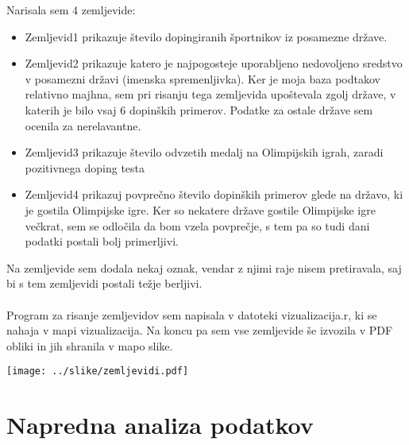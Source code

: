 \documentclass[11pt,a4paper]{article}
\begin{document}
Narisala sem 4 zemljevide:
\begin{itemize}

\item{Zemljevid1 prikazuje število dopingiranih športnikov iz posamezne države.}


\item{Zemljevid2 prikazuje katero je najpogosteje uporabljeno nedovoljeno sredstvo v posamezni državi (imenska spremenljivka).
Ker je moja baza podtakov relativno majhna, sem pri risanju tega zemljevida upoštevala zgolj države, v katerih je bilo vsaj 6 dopinških primerov. Podatke za ostale države sem ocenila za nerelavantne.}

\item{Zemljevid3 prikazuje število odvzetih medalj na Olimpijskih igrah, zaradi pozitivnega doping testa}

\item{Zemljevid4 prikazuj povprečno število dopinških primerov glede na državo, ki je gostila Olimpijske igre. 
Ker so nekatere države gostile Olimpijske igre večkrat, sem se odločila da bom vzela povprečje, s tem pa so tudi dani podatki postali bolj primerljivi.}\\
\end{itemize}
Na zemljevide sem dodala nekaj oznak, vendar z njimi raje nisem pretiravala, saj bi s tem zemljevidi postali težje berljivi.\\
\\
Program za risanje zemljevidov sem napisala v datoteki vizualizacija.r, ki se nahaja v mapi vizualizacija. 
Na koncu pa sem vse zemljevide še izvozila v PDF obliki in jih shranila v mapo slike.

\texttt{[image: ../slike/zemljevidi.pdf]}

\section{Napredna analiza podatkov}

\end{document}
